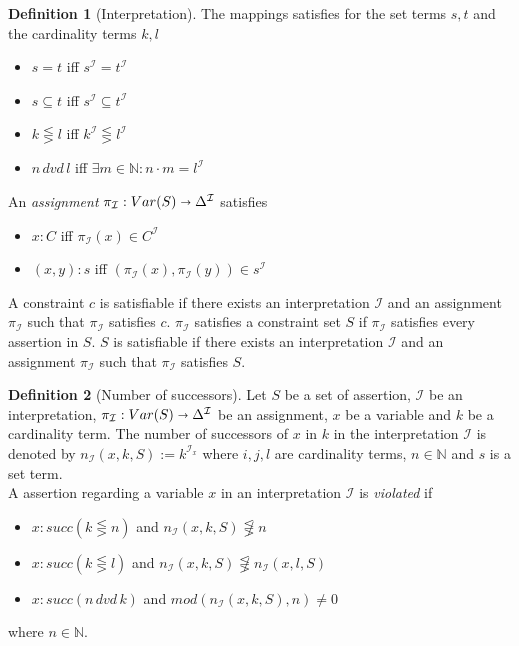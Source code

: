 \documentclass[a4paper,11pt]{scrartcl}
\theoremstyle{break}
\theoremstyle{definition}
\newtheorem{mydef}{Definition}
\begin{document}
\begin{mydef}[Interpretation]
The mappings satisfies for the set terms $s,t$ and the cardinality terms $k,l$
\begin{itemize}
\item $s=t$ iff $s^\mathcal{I}=t^\mathcal{I}$
\item $s\subseteq t$ iff $s^\mathcal{I}\subseteq t^\mathcal{I}$
\item $k\lesseqgtr l$ iff $k^\mathcal{I}\lesseqgtr l^\mathcal{I}$
\item $n\,dvd\,l$ iff $\exists m\in\mathbb{N}:n\cdot m = l^\mathcal{I}$
\end{itemize}
An \textit{assignment} $\pi_\mathcal{I}: Var(S)\shortrightarrow \Delta^\mathcal{I}$ satisfies 
\begin{itemize}
\item $x:C$ iff $\pi_\mathcal{I}(x)\in C^\mathcal{I}$ 
\item $(x,y):s$ iff $(\pi_\mathcal{I}(x),\pi_\mathcal{I}(y))\in s^\mathcal{I}$
\end{itemize} 
A constraint $c$ is satisfiable if there exists an interpretation $\mathcal{I}$ and an assignment $\pi_\mathcal{I}$ such that $\pi_\mathcal{I}$ satisfies $c$. $\pi_\mathcal{I}$ satisfies a constraint set $S$ if $\pi_\mathcal{I}$ satisfies every assertion in $S$. $S$ is satisfiable if there exists an interpretation $\mathcal{I}$ and an assignment $\pi_\mathcal{I}$ such that $\pi_\mathcal{I}$ satisfies $S$.
\end{mydef}
\begin{mydef}[Number of successors]
Let $S$ be a set of assertion, $\mathcal{I}$ be an interpretation, $\pi_\mathcal{I}:Var(S)\shortrightarrow \Delta^\mathcal{I}$ be an assignment, $x$ be a variable and $k$ be a cardinality term. The number of successors of $x$ in $k$ in the interpretation $\mathcal{I}$ is denoted by $n_\mathcal{I}(x,k,S):=k^{\mathcal{I}_x}$
where $i,j,l$ are cardinality terms, $n\in\mathbb{N}$ and $s$ is a set term.\\
A assertion regarding a variable $x$ in an interpretation $\mathcal{I}$ is \textit{violated} if
\begin{itemize}
\item $x:succ(k\lesseqgtr n)$ and $n_\mathcal{I}(x,k,S)\not\lesseqgtr n$
\item $x:succ(k\lesseqgtr l)$ and $n_\mathcal{I}(x,k,S)\not\lesseqgtr n_\mathcal{I}(x,l,S)$
\item $x:succ(n\,dvd\,k)$ and $mod(n_\mathcal{I}(x,k,S),n)\neq 0$
\end{itemize} 
where $n\in\mathbb{N}$.
\end{mydef}
\end{document}
